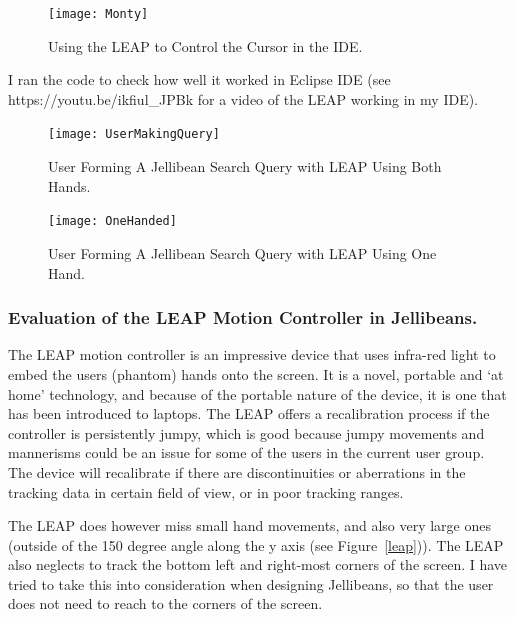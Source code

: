 \documentclass[a4paper, 11pt]{article}
\begin{document}
\begin{figure}[H]
\begin{center}
\texttt{[image: Monty]}\\
\caption{Using the LEAP to Control the Cursor in the IDE.}
\label{Monty}
\end{center}
\end{figure}

I ran the code to check how well it worked in Eclipse IDE (see https://youtu.be/ikfiul\_JPBk for a video of the LEAP working in my IDE).

\begin{figure}[H]
\begin{center}
\texttt{[image: UserMakingQuery]}
\caption{User Forming A Jellibean Search Query with LEAP Using Both Hands.}
\label{UserMakingQuery}
\end{center}
\end{figure}

\begin{figure}[H]
\begin{center}
\texttt{[image: OneHanded]}
\caption{User Forming A Jellibean Search Query with LEAP Using One Hand.}
\label{OneHanded}
\end{center}
\end{figure}

\subsubsection {Evaluation of the LEAP Motion Controller in Jellibeans.}
The LEAP motion controller is an impressive device that uses infra-red light to embed the users (phantom) hands onto the screen. It is a novel, portable and `at home' technology, and because of the portable nature of the device, it is one that has been introduced to laptops. The LEAP offers a recalibration process if the controller is persistently jumpy, which is good because jumpy movements and mannerisms could be an issue for some of the users in the current user group. The device will recalibrate if there are discontinuities or aberrations in the tracking data in certain field of view, or in poor tracking ranges. 

\vspace{5mm}
The LEAP does however miss small hand movements, and also very large ones (outside of the 150 degree angle along the y axis (see Figure~\ref{leap})). The LEAP also neglects to track the bottom left and right-most corners of the screen. I have tried to take this into consideration when designing Jellibeans, so that the user does not need to reach to the corners of the screen.
\end{document}
